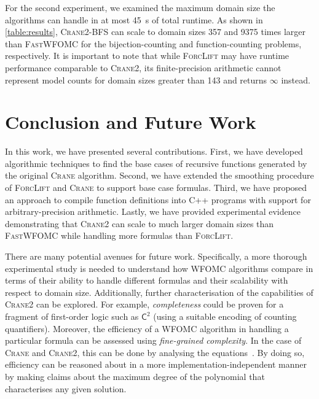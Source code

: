 \documentclass[letterpaper]{article} %
\theoremstyle{remark}
\theoremstyle{definition}
\newcommand{\Ctwo}{$\mathsf{C}^{2}$}
\newcommand{\Cranetwo}{\textsc{Crane2}}
\newcommand{\Cranebfs}{\textsc{Crane2-BFS}}
\begin{document}
For the second experiment, we examined the maximum domain size the algorithms
can handle in at most \SI{45}{\second} of total runtime. As shown in
\cref{table:results}, \Cranebfs{} can scale to domain sizes \num{357} and
\num{9375} times larger than \textsc{FastWFOMC} for the bijection-counting and
function-counting problems, respectively. It is important to note that while
\textsc{ForcLift} may have runtime performance comparable to \Cranetwo{}, its
finite-precision arithmetic cannot represent model counts for domain sizes
greater than 143 and returns $\infty$ instead.

\section{Conclusion and Future Work}

In this work, we have presented several contributions. First, we have developed
algorithmic techniques to find the base cases of recursive functions generated
by the original \textsc{Crane} algorithm. Second, we have extended the smoothing
procedure of \textsc{ForcLift} and \textsc{Crane} to support base case formulas.
Third, we have proposed an approach to compile function definitions into C++
programs with support for arbitrary-precision arithmetic. Lastly, we have
provided experimental evidence demonstrating that \Cranetwo{} can scale to much
larger domain sizes than \textsc{FastWFOMC} while handling more formulas than
\textsc{ForcLift}.

There are many potential avenues for future work. Specifically, a more thorough
experimental study is needed to understand how WFOMC algorithms compare in terms
of their ability to handle different formulas and their scalability with respect
to domain size. Additionally, further characterisation of the capabilities of
\Cranetwo{} can be explored. For example, \emph{completeness} could be proven
for a fragment of first-order logic such as \Ctwo{} (using a suitable encoding
of counting quantifiers). Moreover, the efficiency of a WFOMC algorithm in
handling a particular formula can be assessed using \emph{fine-grained
  complexity}. In the case of \textsc{Crane} and \Cranetwo{}, this can be done
by analysing the equations~\cite{DBLP:conf/kr/DilkasB23}. By doing so,
efficiency can be reasoned about in a more implementation-independent manner by
making claims about the maximum degree of the polynomial that characterises any
given solution.


\end{document}
